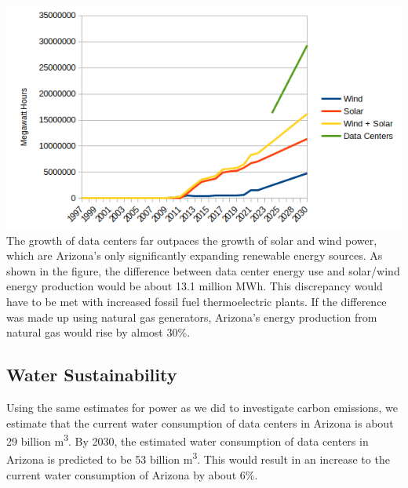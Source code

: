 \documentclass[letterpaper, 12 pt]{article}  %
\begin{document}
\includegraphics[scale=.75]{projection.png} 
The growth of data centers far outpaces the growth of solar and wind power, which are Arizona’s only significantly expanding renewable energy sources. As shown in the figure, the difference between data center energy use and solar/wind energy production would be about 13.1 million MWh. This discrepancy would have to be met with increased fossil fuel thermoelectric plants. If the difference was made up using natural gas generators, Arizona’s energy production from natural gas would rise by almost 30\%. 

\subsection{Water Sustainability}
Using the same estimates for power as we did to investigate carbon emissions, we estimate that the current water consumption of data centers in Arizona is about 29 billion m\textsuperscript{3}. By 2030, the estimated water consumption of data centers in Arizona is predicted to be 53 billion m\textsuperscript{3}. This would result in an increase to the current water consumption of Arizona by about 6\%. 
\end{document}
